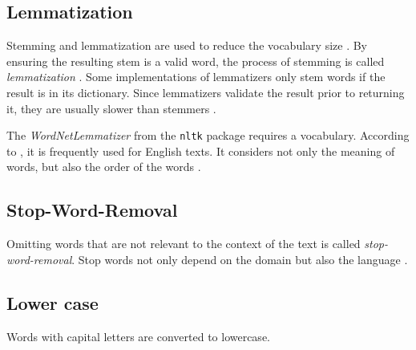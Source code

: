 \subsection{Lemmatization}\label{subsec:lemmatization}

Stemming and lemmatization are used to reduce the vocabulary size \cite{clusteringDocs2020}.
By ensuring the resulting stem is a valid word, the process of stemming is called \textit{lemmatization} \cite{nlp-book2009}.
Some implementations of lemmatizers only stem words if the result is in its dictionary.
Since lemmatizers validate the result prior to returning it, they are usually slower than stemmers \cite{nlp-book2009}.

The \textit{WordNetLemmatizer} from the \texttt{nltk} package requires a vocabulary. %
According to \citeauthor{clusteringDocs2020}, it is frequently used for English texts.
It considers not only the meaning of words, but also the order of the words \cite{clusteringDocs2020}.


\subsection{Stop-Word-Removal}\label{subsec:stop-word-removal}

Omitting words that are not relevant to the context of the text is called \textit{stop-word-removal}.
Stop words not only depend on the domain but also the language \cite{IR2011}.


\subsection{Lower case}\label{subsec:lower-case}

Words with capital letters are converted to lowercase.